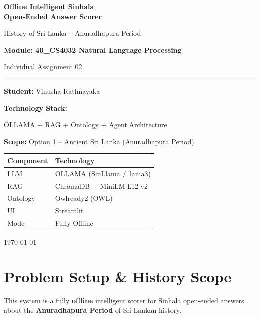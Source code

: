 \documentclass[12pt,a4paper]{article}
\begin{document}
\begin{titlepage}
\centering
\vspace*{2cm}
{\Huge\bfseries\color{accent} Offline Intelligent Sinhala\\Open-Ended Answer Scorer\par}
\vspace{0.5cm}
{\Large History of Sri Lanka -- Anuradhapura Period\par}
\vspace{1.5cm}
{\large\bfseries Module: 40\_CS4032 Natural Language Processing\par}
{\large Individual Assignment 02\par}
\vspace{1cm}
\rule{0.6\textwidth}{0.5pt}\par
\vspace{1cm}
{\large\bfseries Student:} Vinusha Rathnayaka\par
\vspace{0.5cm}
{\large\bfseries Technology Stack:}\par
OLLAMA + RAG + Ontology + Agent Architecture\par
\vspace{0.5cm}
{\large\bfseries Scope:} Option 1 -- Ancient Sri Lanka (Anuradhapura Period)\par
\vspace{2cm}
\begin{tabular}{ll}
\toprule
Component & Technology \\
\midrule
LLM & OLLAMA (SinLlama / llama3) \\
RAG & ChromaDB + MiniLM-L12-v2 \\
Ontology & Owlready2 (OWL) \\
UI & Streamlit \\
Mode & Fully Offline \\
\bottomrule
\end{tabular}
\vfill
{\large \today\par}
\end{titlepage}

\tableofcontents
\newpage

\section{Problem Setup \& History Scope}

This system is a fully \textbf{offline} intelligent scorer for Sinhala open-ended answers about the \textbf{Anuradhapura Period} of Sri Lankan history.
\end{document}
